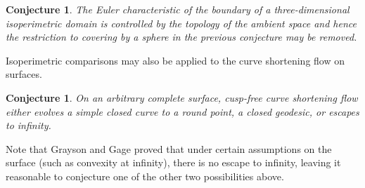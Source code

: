 \documentclass[12pt]{article}
\newtheorem{Conjecture}[theorem]{Conjecture}
\begin{document}
\begin{Conjecture}
The Euler characteristic of the boundary of a three-dimensional isoperimetric domain is controlled by the topology of the ambient space and hence the restriction to covering by a sphere in the previous conjecture may be removed.
\end{Conjecture}

Isoperimetric comparisons may also be applied to the curve shortening flow on surfaces.

\begin{Conjecture}
On an arbitrary complete surface, cusp-free curve shortening flow either evolves a simple closed curve to a round point, a closed geodesic, or escapes to infinity.
\end{Conjecture}

Note that Grayson \cite{Gr} and Gage \cites{Ga1, Ga2} proved that under certain assumptions on the surface (such as convexity at infinity), there is no escape to infinity, leaving it reasonable to conjecture one of the other two possibilities above.
\end{document}
